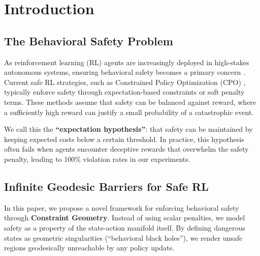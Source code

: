 \section{Introduction}
\label{sec:intro}

\subsection{The Behavioral Safety Problem}

As reinforcement learning (RL) agents are increasingly deployed in high-stakes autonomous systems, ensuring behavioral safety becomes a primary concern \citep{amodei2016concrete}. Current safe RL strategies, such as Constrained Policy Optimization (CPO) \citep{achiam2017constrained}, typically enforce safety through expectation-based constraints or soft penalty terms. These methods assume that safety can be balanced against reward, where a sufficiently high reward can justify a small probability of a catastrophic event.

We call this the \textbf{``expectation hypothesis''}: that safety can be maintained by keeping expected costs below a certain threshold. In practice, this hypothesis often fails when agents encounter deceptive rewards that overwhelm the safety penalty, leading to 100\% violation rates in our experiments.

\subsection{Infinite Geodesic Barriers for Safe RL}

In this paper, we propose a novel framework for enforcing behavioral safety through \textbf{Constraint Geometry}. Instead of using scalar penalties, we model safety as a property of the state-action manifold itself. By defining dangerous states as geometric singularities (``behavioral black holes''), we render unsafe regions geodesically unreachable by any policy update.

